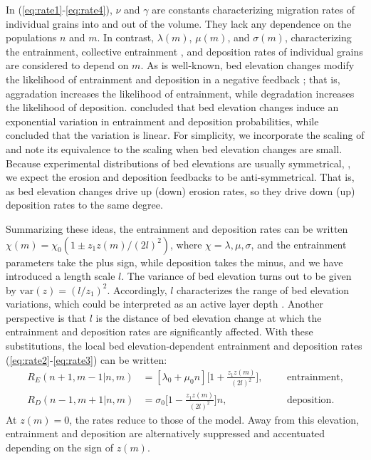 \documentclass[draft]{agujournal2018}
\begin{document}
In (\ref{eq:rate1}-\ref{eq:rate4}), $\nu$ and $\gamma$ are constants characterizing migration rates of individual grains into and out of the volume. 
They lack any dependence on the populations $n$ and $m$.
In contrast, $\lambda(m)$, $\mu(m)$, and $\sigma(m)$, characterizing the entrainment, collective entrainment \citep[e.g.][]{Ancey2008, Heyman2013, Heyman2014}, and deposition rates of individual grains are considered to depend on $m$.
As is well-known, bed elevation changes modify the likelihood of entrainment and deposition in a negative feedback \citep{Sawai1987, Wong2007}; that is, aggradation increases the likelihood of entrainment, while degradation increases the likelihood of deposition.
\citet{Wong2007} concluded that bed elevation changes induce an exponential variation in entrainment and deposition probabilities, while \citet{Sawai1987} concluded that the variation is linear.
For simplicity, we incorporate the scaling of \citet{Sawai1987} and note its equivalence to the \citet{Wong2007} scaling when bed elevation changes are small.
Because experimental distributions of bed elevations are usually symmetrical, \citep{Wong2007, Singh2009, Martin2014}, we expect the erosion and deposition feedbacks to be anti-symmetrical.
That is, as bed elevation changes drive up (down) erosion rates, so they drive down (up) deposition rates to the same degree.


Summarizing these ideas, the entrainment and deposition rates can be written $\chi(m) = \chi_0(1\pm z_1 z(m)/(2l)^2)$, where $\chi = \lambda, \mu, \sigma$, and the entrainment parameters take the plus sign, while deposition takes the minus, and we have introduced a length scale $l$.
The variance of bed elevation turns out to be given by $\text{var}(z) = (l / z_1)^2$. Accordingly, $l$ characterizes the range of bed elevation variations, which could be interpreted as an active layer depth \citep[e.g.][]{Church2017}.
Another perspective is that $l$ is the distance of bed elevation change at which the entrainment and deposition rates are significantly affected.
With these substitutions, the local bed elevation-dependent entrainment and deposition rates (\ref{eq:rate2}-\ref{eq:rate3}) can be written:
\begin{align}
R_E(n+1,m-1|n,m)&=[\lambda_0 + \mu_0 n]\Big[1 + \frac{z_1z(m)}{(2l)^2}\Big], && &\text{entrainment}, \label{eq:rate5}\\
R_D(n-1,m+1|n,m)&=\sigma_0 \Big[1-\frac{z_1z(m)}{(2l)^2}\Big]n, && &\text{deposition}. \label{eq:rate6}
\end{align}
At $z(m)=0$, the rates reduce to those of the \citet{Ancey2008} model.
Away from this elevation, entrainment and deposition are alternatively suppressed and accentuated depending on the sign of $z(m)$.
\end{document}
